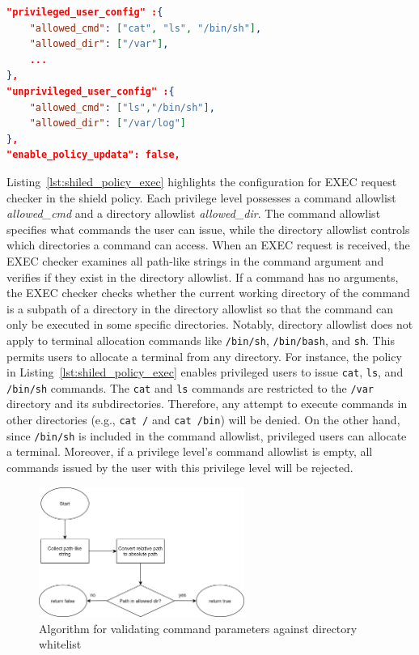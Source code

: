 \begin{lstlisting}[language=json, caption= EXEC request checker's configuration in the shield policy, label={lst:shiled_policy_exec}]
"privileged_user_config" :{
    "allowed_cmd": ["cat", "ls", "/bin/sh"],
    "allowed_dir": ["/var"],
    ...
},
"unprivileged_user_config" :{
    "allowed_cmd": ["ls","/bin/sh"],
    "allowed_dir": ["/var/log"]    
},
"enable_policy_updata": false,
\end{lstlisting}

Listing~\ref*{lst:shiled_policy_exec} highlights the configuration for EXEC request checker in the shield policy. Each privilege level possesses a command allowlist \emph{allowed\_cmd} and a directory allowlist \emph{allowed\_dir}. The command allowlist specifies what commands the user can issue, while the 
directory allowlist controls which directories a command can access. When an EXEC request is received, the EXEC checker examines all path-like strings in the command argument and verifies if they exist in the directory allowlist. If a command has no arguments, the EXEC checker checks whether the 
current working directory of the command is a subpath of a directory in the directory allowlist so that the command can only be executed in some specific directories. Notably, directory allowlist does not apply to terminal allocation commands like \texttt{/bin/sh}, \texttt{/bin/bash}, and \texttt{sh}. 
This permits users to allocate a terminal from any directory. For instance, the policy in Listing~\ref*{lst:shiled_policy_exec} enables privileged users to issue \texttt{cat}, \texttt{ls}, and \texttt{/bin/sh} commands. The \texttt{cat} and \texttt{ls} commands are restricted to the \texttt{/var} directory 
and its subdirectories. Therefore, any attempt to execute commands in other directories (e.g., 
\texttt{cat /} and \texttt{cat /bin}) will be denied. On the other hand, since \texttt{/bin/sh} is included in the command allowlist, privileged users can allocate a terminal. Moreover, if a privilege level's command allowlist is empty, all commands issued by the user with this privilege level will be rejected.

\begin{figure}[!htb]
    \centering
    \includegraphics[width=0.6\textwidth]{images/algo_for_path_checking.png}
    \caption[Algorithm for validating command parameters against directory whitelist]{Algorithm for validating command parameters against directory whitelist}
    \label{fig:algo_for_path_checking}
\end{figure}


